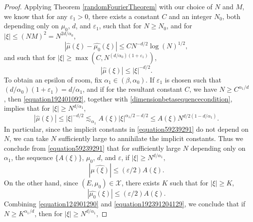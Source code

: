 \documentclass[12pt,reqno]{article}
\begin{document}
\begin{proof}
    Applying Theorem \ref{randomFourierTheorem} with our choice of $N$ and $M$, we know that for any $\varepsilon_1 > 0$, there exists a constant $C$ and an integer $N_0$, both depending only on $\mu_0$, $d$, and $\varepsilon_1$, such that for $N \geq N_0$, and for $|\xi| \leq (NM)^2 = N^{2d/\alpha_0}$,
    \begin{equation} \label{equation1092490129012}
        |\widehat{\mu}(\xi) - \widehat{\mu_0}(\xi)| \leq C N^{-d/2} \log(N)^{1/2},
    \end{equation}
    and such that for $|\xi| \geq \max \left(C,N^{(d/\alpha_0)(1 + \varepsilon_1)} \right)$,
    \begin{equation} \label{equation192401092}
        |\widehat{\mu}(\xi)| \leq |\xi|^{-d/2}.
    \end{equation}
    To obtain an epsilon of room, fix $\alpha_1 \in (\beta,\alpha_0)$. If $\varepsilon_1$ is chosen such that $(d/\alpha_0)(1 + \varepsilon_1) = d/\alpha_1$, and if for the resultant constant $C$, we have $N \geq C^{\alpha_1/d}$, then \eqref{equation192401092}, together with \eqref{dimensionbetasequencecondition}, implies that for $|\xi| \geq N^{d/\alpha_1}$,
    \begin{equation} \label{equation59239291}
        |\widehat{\mu}(\xi)| \leq |\xi|^{-d/2} \lesssim_{\alpha_1} A(\xi) |\xi|^{\alpha_1/2-d/2} \leq A(\xi) N^{d/2(1 - d/\alpha_1)}.
    \end{equation}
    In particular, since the implicit constants in \eqref{equation59239291} do not depend on $N$, we can take $N$ sufficiently large to annihilate the implicit constants. Thus we conclude from \eqref{equation59239291} that for sufficiently large $N$ depending only on $\alpha_1$, the sequence $ \{ A(\xi) \}$, $\mu_0$, $d$, and $\varepsilon$, if $|\xi| \geq N^{d/\alpha_1},$
    \begin{equation} \label{equation124901290}
        |\widehat{\mu(\xi)}| \leq (\varepsilon/2) A(\xi).
    \end{equation}
    On the other hand, since $(E,\mu_0) \in \mathcal{X}$, there exists $K$ such that for $|\xi| \geq K$,
    \begin{equation} \label{equation192391204129}
        |\widehat{\mu_0}(\xi)| \leq (\varepsilon/2) A(\xi).
    \end{equation}
    Combining \eqref{equation124901290} and \eqref{equation192391204129}, we conclude that if $N \geq K^{\alpha_1/d}$, then for $|\xi| \geq N^{d/\alpha_1}$,

\end{proof}
\end{document}
